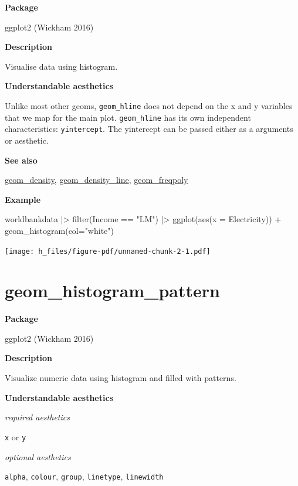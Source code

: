 \documentclass[
  letterpaper,
  DIV=11,
  numbers=noendperiod]{scrreprt}
\newenvironment{Shaded}{\begin{snugshade}}{\end{snugshade}}
\newcommand{\AttributeTok}[1]{\textcolor[rgb]{0.40,0.45,0.13}{#1}}
\newcommand{\FunctionTok}[1]{\textcolor[rgb]{0.28,0.35,0.67}{#1}}
\newcommand{\NormalTok}[1]{\textcolor[rgb]{0.00,0.23,0.31}{#1}}
\newcommand{\SpecialCharTok}[1]{\textcolor[rgb]{0.37,0.37,0.37}{#1}}
\newcommand{\StringTok}[1]{\textcolor[rgb]{0.13,0.47,0.30}{#1}}
\begin{document}
\textbf{Package}

ggplot2 (Wickham 2016)

\textbf{Description}

Visualise data using histogram.

\textbf{Understandable aesthetics}

Unlike most other geoms, \texttt{geom\_hline} does not depend on the x
and y variables that we map for the main plot. \texttt{geom\_hline} has
its own independent characteristics: \texttt{yintercept}. The yintercept
can be passed either as a arguments or aesthetic.

\textbf{See also}

\hyperref[density]{geom\_density},
\hyperref[density_line]{geom\_density\_line},
\hyperref[freqpoly]{geom\_freqpoly}

\textbf{Example}

\begin{Shaded}
\begin{Highlighting}[]
\NormalTok{worldbankdata }\SpecialCharTok{|\textgreater{}}
  \FunctionTok{filter}\NormalTok{(Income }\SpecialCharTok{==} \StringTok{"LM"}\NormalTok{) }\SpecialCharTok{|\textgreater{}}
  \FunctionTok{ggplot}\NormalTok{(}\FunctionTok{aes}\NormalTok{(}\AttributeTok{x =}\NormalTok{ Electricity)) }\SpecialCharTok{+}   
  \FunctionTok{geom\_histogram}\NormalTok{(}\AttributeTok{col=}\StringTok{"white"}\NormalTok{)}
\end{Highlighting}
\end{Shaded}

\texttt{[image: h\_files/figure-pdf/unnamed-chunk-2-1.pdf]}

\section{geom\_histogram\_pattern}\label{histogram_pattern}

\textbf{Package}

ggplot2 (Wickham 2016)

\textbf{Description}

Visualize numeric data using histogram and filled with patterns.

\textbf{Understandable aesthetics}

\emph{required aesthetics}

\texttt{x} or \texttt{y}

\emph{optional aesthetics}

\texttt{alpha}, \texttt{colour}, \texttt{group}, \texttt{linetype},
\texttt{linewidth}
\end{document}
